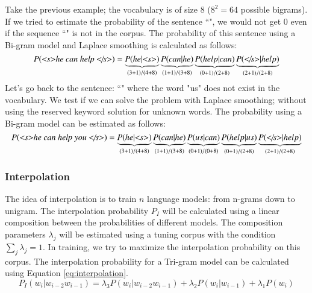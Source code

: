 \documentclass{KBook}
\begin{document}
Take the previous example; the vocabulary is of size $8$ ($8^2 = 64$ possible bigrams).
If we tried to estimate the probability of the sentence ``", we would not get $0$ even if the sequence ``" is not in the corpus.
The probability of this sentence using a Bi-gram model and Laplace smoothing is calculated as follows:
\[
P(\text{\textit{\textless s\textgreater he can help \textless/s\textgreater}}) = 
\underbrace{P(he|\text{\textit{\textless s\textgreater}})}_{(3+1)/(4+8)}
\underbrace{P(can|he)}_{(1+1)/(3+8)} 
\underbrace{P(help|can)}_{(0+1)/(2+8)}
\underbrace{P(\text{\textit{\textless/s\textgreater}}|help)}_{(2+1)/(2+8)}
\]
%
Let's go back to the sentence: 
``" where the word "us" does not exist in the vocabulary.
We test if we can solve the problem with Laplace smoothing; without using the reserved keyword solution for unknown words.
The probability using a Bi-gram model can be estimated as follows:
\[
P(\text{\textit{\textless s\textgreater he can help you \textless/s\textgreater}}) = 
\underbrace{P(he|\text{\textit{\textless s\textgreater}})}_{(3+1)/(4+8)}
\underbrace{P(can|he)}_{(1+1)/(3+8)} 
\underbrace{P(us|can)}_{(0+1)/(0+8)} 
\underbrace{P(help|us)}_{(0+1)/(2+8)}
\underbrace{P(\text{\textit{\textless/s\textgreater}}|help)}_{(2+1)/(2+8)}
\]


\subsubsection{Interpolation}

The idea of interpolation is to train $n$ language models: from n-grams down to unigram. 
The interpolation probability $P_I$ will be calculated using a linear composition between the probabilities of different models. 
The composition parameters $\lambda_j$ will be estimated using a tuning corpus with the condition $\sum_j \lambda_j = 1$.
In training, we try to maximize the interpolation probability on this corpus.
The interpolation probability for a Tri-gram model can be calculated using Equation \ref{eq:interpolation}. 
\begin{equation}
	P_{I}(w_i | w_{i-2} w_{i-1}) = 
	\lambda_3 P(w_i | w_{i-2} w_{i-1}) 
	+ \lambda_2 P(w_i | w_{i-1}) 
	+ \lambda_1 P(w_i) 
	\label{eq:interpolation}
\end{equation}
\end{document}
